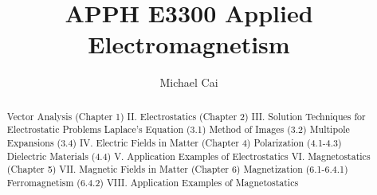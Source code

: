 \documentclass[a4paper]{report}
\author{Michael Cai}
\title{APPH E3300 Applied Electromagnetism
}
\begin{document}
\maketitle

\begin{abstract}
	Vector Analysis (Chapter 1)
	II. Electrostatics (Chapter 2)
	III. Solution Techniques for Electrostatic Problems
	Laplace’s Equation (3.1)
	Method of Images (3.2)
	Multipole Expansions (3.4)
	IV. Electric Fields in Matter (Chapter 4)
	Polarization (4.1-4.3)
	Dielectric Materials (4.4)
	V. Application Examples of Electrostatics
	VI. Magnetostatics (Chapter 5)
	VII. Magnetic Fields in Matter (Chapter 6)
	Magnetization (6.1-6.4.1)
	Ferromagnetism (6.4.2)
	VIII. Application Examples of Magnetostatics
	
\end{abstract}

\newpage


\end{document}
